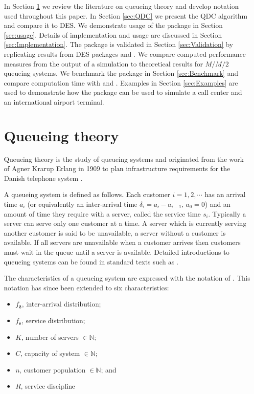 \documentclass[article]{jss}
\begin{document}
In Section \ref{sec:queueing} we review the literature on queueing theory and develop notation used throughout this paper. In Section \ref{sec:QDC} we present the QDC algorithm and compare it to DES. We demonstrate usage of the package in Section \ref{sec:usage}. Details of implementation and usage are discussed in Section \ref{sec:Implementation}. The package is validated in Section \ref{sec:Validation} by replicating results from DES packages  and . We compare computed performance measures from the output of a  simulation to theoretical results for $M/M/2$ queueing systems. We benchmark the package in Section \ref{sec:Benchmark} and compare computation time with  and . Examples in Section \ref{sec:Examples} are used to demonstrate how the package can be used to simulate a call center and an international airport terminal. 

\section{Queueing theory} \label{sec:queueing}

Queueing theory is the study of queueing systems and originated from the work of Agner Krarup Erlang in 1909 to plan infrastructure requirements for the Danish telephone system \citep[pg 2]{thomopoulos2012fundamentals}. 

A queueing system is defined as follows. Each customer $i = 1,2,\cdots$ has an arrival time $a_i$ (or equivalently an inter-arrival time $\delta_i = a_i - a_{i-1}$, $a_0 = 0$) and an amount of time they require with a server, called the service time $s_i$. Typically a server can serve only one customer at a time. A server which is currently serving another customer is said to be unavailable, a server without a customer is available. If all servers are unavailable when a customer arrives then customers must wait in the queue until a server is available. Detailed introductions to queueing systems can be found in standard texts such as \citet{bhat2015introduction}. 

The characteristics of a queueing system are expressed with the notation of \citet{kendall1953stochastic}. This notation has since been extended to six characteristics:
\begin{itemize}
\item $f_{\mathbf{\delta}}$, inter-arrival distribution;
\item $f_{\mathbf{s}}$, service distribution; 
\item $K$, number of servers $\in \mathbb{N}$;
\item $C$, capacity of system $\in \mathbb{N}$; 
\item $n$, customer population $\in \mathbb{N}$; and
\item $R$, service discipline
\end{itemize}
\end{document}
